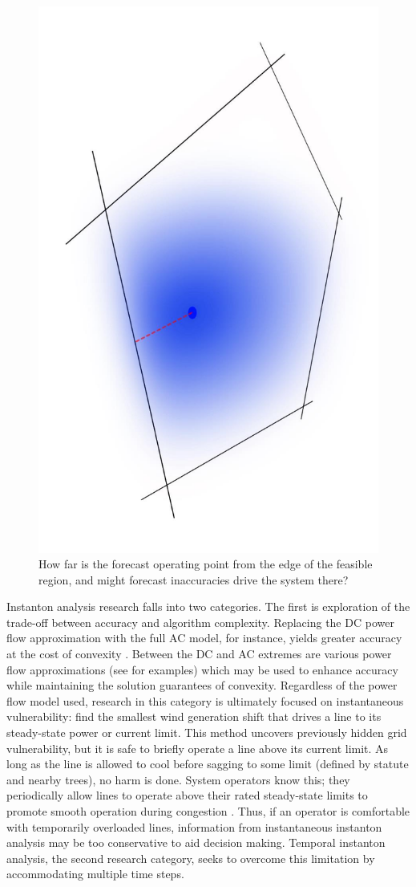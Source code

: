 \documentclass[journal,twoside]{IEEEtran}
\begin{document}
\begin{figure}
\centering
\includegraphics[angle=90,width=0.6\linewidth]{stylizedFeas}
\caption{How far is the forecast operating point from the edge of the feasible region, and might forecast inaccuracies drive the system there?}
\label{fig:stylizedFeas}
\end{figure}

Instanton analysis research falls into two categories. The first is exploration of the trade-off between accuracy and algorithm complexity. Replacing the DC power flow approximation with the full AC model, for instance, yields greater accuracy at the cost of convexity \cite{baghsorkhi2012}. Between the DC and AC extremes are various power flow approximations (see \cite{coffrin2012,hijazi2013,coffrin2014} for examples) which may be used to enhance accuracy while maintaining the solution guarantees of convexity. Regardless of the power flow model used, research in this category is ultimately focused on instantaneous vulnerability: find the smallest wind generation shift that drives a line to its steady-state power or current limit. This method uncovers previously hidden grid vulnerability, but it is safe to briefly operate a line above its current limit. As long as the line is allowed to cool before sagging to some limit (defined by statute and nearby trees), no harm is done. System operators know this; they periodically allow lines to operate above their rated steady-state limits to promote smooth operation during congestion \cite{banakar2005}. Thus, if an operator is comfortable with temporarily overloaded lines, information from instantaneous instanton analysis may be too conservative to aid decision making. Temporal instanton analysis, the second research category, seeks to overcome this limitation by accommodating multiple time steps.
\end{document}
